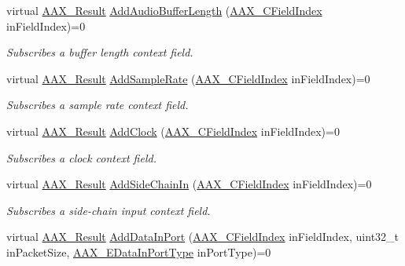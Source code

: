 \begin{DoxyCompactItemize}
virtual \mbox{\hyperlink{a00392_a4d8f69a697df7f70c3a8e9b8ee130d2f}{A\+A\+X\+\_\+\+Result}} \mbox{\hyperlink{a01625_a38c2683ca133ca0863e4645afd27ab9f}{Add\+Audio\+Buffer\+Length}} (\mbox{\hyperlink{a00392_ae807f8986143820cfb5d6da32165c9c7}{A\+A\+X\+\_\+\+C\+Field\+Index}} in\+Field\+Index)=0
\begin{DoxyCompactList}\small\item\em Subscribes a buffer length context field. \end{DoxyCompactList}\item 
virtual \mbox{\hyperlink{a00392_a4d8f69a697df7f70c3a8e9b8ee130d2f}{A\+A\+X\+\_\+\+Result}} \mbox{\hyperlink{a01625_aa59e93b261ae1f4951ed84b55b70742e}{Add\+Sample\+Rate}} (\mbox{\hyperlink{a00392_ae807f8986143820cfb5d6da32165c9c7}{A\+A\+X\+\_\+\+C\+Field\+Index}} in\+Field\+Index)=0
\begin{DoxyCompactList}\small\item\em Subscribes a sample rate context field. \end{DoxyCompactList}\item 
virtual \mbox{\hyperlink{a00392_a4d8f69a697df7f70c3a8e9b8ee130d2f}{A\+A\+X\+\_\+\+Result}} \mbox{\hyperlink{a01625_af9864953ec953720b844e9ad57a2da14}{Add\+Clock}} (\mbox{\hyperlink{a00392_ae807f8986143820cfb5d6da32165c9c7}{A\+A\+X\+\_\+\+C\+Field\+Index}} in\+Field\+Index)=0
\begin{DoxyCompactList}\small\item\em Subscribes a clock context field. \end{DoxyCompactList}\item 
virtual \mbox{\hyperlink{a00392_a4d8f69a697df7f70c3a8e9b8ee130d2f}{A\+A\+X\+\_\+\+Result}} \mbox{\hyperlink{a01625_ac88f0100827278c2f9bfae2f74ae103f}{Add\+Side\+Chain\+In}} (\mbox{\hyperlink{a00392_ae807f8986143820cfb5d6da32165c9c7}{A\+A\+X\+\_\+\+C\+Field\+Index}} in\+Field\+Index)=0
\begin{DoxyCompactList}\small\item\em Subscribes a side-\/chain input context field. \end{DoxyCompactList}\item 
virtual \mbox{\hyperlink{a00392_a4d8f69a697df7f70c3a8e9b8ee130d2f}{A\+A\+X\+\_\+\+Result}} \mbox{\hyperlink{a01625_af15ea360a7e581ac796b95b473057dad}{Add\+Data\+In\+Port}} (\mbox{\hyperlink{a00392_ae807f8986143820cfb5d6da32165c9c7}{A\+A\+X\+\_\+\+C\+Field\+Index}} in\+Field\+Index, uint32\+\_\+t in\+Packet\+Size, \mbox{\hyperlink{a00491_ab5677b173ad8647c24d34d28272d11fc}{A\+A\+X\+\_\+\+E\+Data\+In\+Port\+Type}} in\+Port\+Type)=0

\end{DoxyCompactItemize}
